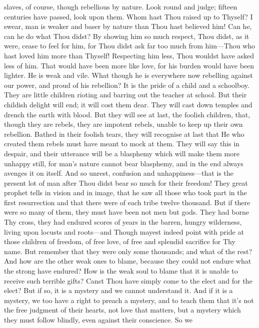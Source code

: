 slaves, of course, though rebellious by nature. Look round and judge;
fifteen centuries have passed, look upon them. Whom hast Thou raised
up to Thyself? I swear, man is weaker and baser by nature than Thou
hast believed him! Can he, can he do what Thou didst? By showing him
so much respect, Thou didst, as it were, cease to feel for him, for
Thou didst ask far too much from him---Thou who hast loved him more
than Thyself! Respecting him less, Thou wouldst have asked less of
him. That would have been more like love, for his burden would have
been lighter. He is weak and vile. What though he is everywhere now
rebelling against our power, and proud of his rebellion? It is the
pride of a child and a schoolboy. They are little children rioting and
barring out the teacher at school. But their childish delight will
end; it will cost them dear. They will cast down temples and drench
the earth with blood. But they will see at last, the foolish children,
that, though they are rebels, they are impotent rebels, unable to keep
up their own rebellion. Bathed in their foolish tears, they will
recognise at last that He who created them rebels must have meant to
mock at them. They will say this in despair, and their utterance will
be a blasphemy which will make them more unhappy still, for man's
nature cannot bear blasphemy, and in the end always avenges it on
itself. And so unrest, confusion and un\-hap\-pi\-ness---that is the
present lot of man after Thou didst bear so much for their freedom!
They great prophet tells in vision and in image, that he saw all those
who took part in the first resurrection and that there were of each
tribe twelve thousand. But if there were so many of them, they must
have been not men but gods. They had borne Thy cross, they had endured
scores of years in the barren, hungry wilderness, living upon locusts
and roots---and Though mayest indeed point with pride at those
children of freedom, of free love, of free and splendid sacrifice for
Thy name. But remember that they were only some thousands; and what of
the rest? And how are the other weak ones to blame, because they could
not endure what the strong have endured? How is the  weak
soul to blame that it is unable to receive such terrible gifts? Canst
Thou have simply come to the elect and for the elect? But if so, it is
a mystery and we cannot understand it. And if it is a mystery, we too
have a right to preach a mystery, and to teach them that it's not the
free judgment of their hearts, not love that matters, but a mystery
which they must follow blindly, even against their conscience. So we

